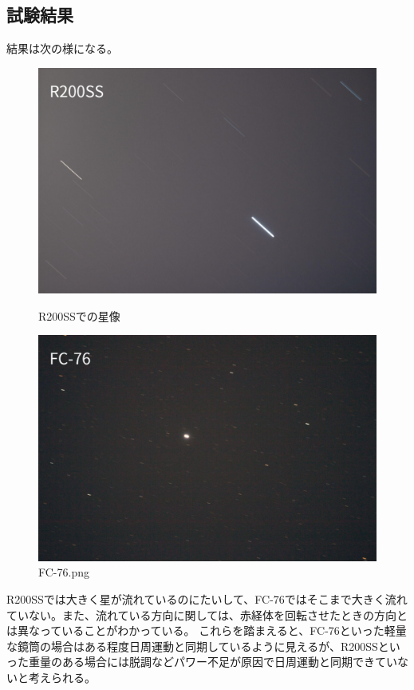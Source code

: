 \documentclass[../../main]{subfiles}
\begin{document}
\subsection{試験結果}
結果は次の様になる。
\begin{figure}[H]
  \centering
  \begin{minipage}{0.4\columnwidth}
    \centering
    \includegraphics[width=\columnwidth]{R200SS.png}
    \caption{R200SSでの星像}
    \label{fig:R200SS}
  \end{minipage}
  \begin{minipage}{0.4\columnwidth}
    \centering
    \includegraphics[width=\columnwidth]{FC-76.png}
    \caption{FC-76.png}
    \label{fig:FC-76}
  \end{minipage}
\end{figure}
R200SSでは大きく星が流れているのにたいして、FC-76ではそこまで大きく流れていない。また、流れている方向に関しては、赤経体を回転させたときの方向とは異なっていることがわかっている。
これらを踏まえると、FC-76といった軽量な鏡筒の場合はある程度日周運動と同期しているように見えるが、R200SSといった重量のある場合には脱調などパワー不足が原因で日周運動と同期できていないと考えられる。
\end{document}
